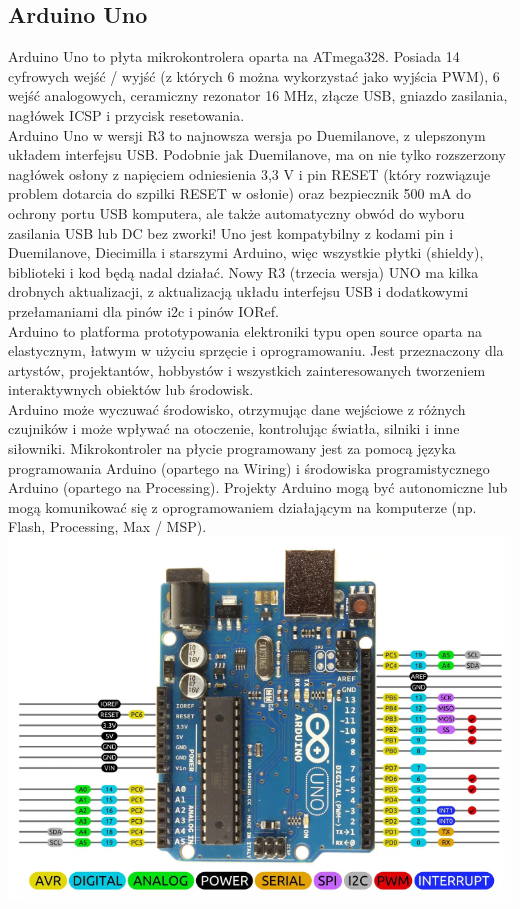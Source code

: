 \documentclass{classrep}
\begin{document}
\subsection {Arduino Uno}
Arduino Uno to płyta mikrokontrolera oparta na ATmega328. Posiada 14 cyfrowych wejść / wyjść (z których 6 można wykorzystać jako wyjścia PWM), 6 wejść analogowych, ceramiczny rezonator 16 MHz, złącze USB, gniazdo zasilania, nagłówek ICSP i przycisk resetowania.\\

Arduino Uno w wersji R3 to najnowsza wersja po Duemilanove, z ulepszonym układem interfejsu USB. Podobnie jak Duemilanove, ma on nie tylko rozszerzony nagłówek osłony z napięciem odniesienia 3,3 V i pin RESET (który rozwiązuje problem dotarcia do szpilki RESET w osłonie) oraz bezpiecznik 500 mA do ochrony portu USB komputera, ale także automatyczny obwód do wyboru zasilania USB lub DC bez zworki! Uno jest kompatybilny z kodami pin i Duemilanove, Diecimilla i starszymi Arduino, więc wszystkie płytki (shieldy), biblioteki i kod będą nadal działać. Nowy R3 (trzecia wersja) UNO ma kilka drobnych aktualizacji, z aktualizacją układu interfejsu USB i dodatkowymi przełamaniami dla pinów i2c i pinów IORef.\\

Arduino to platforma prototypowania elektroniki typu open source oparta na elastycznym, łatwym w użyciu sprzęcie i oprogramowaniu. Jest przeznaczony dla artystów, projektantów, hobbystów i wszystkich zainteresowanych tworzeniem interaktywnych obiektów lub środowisk.\\

Arduino może wyczuwać środowisko, otrzymując dane wejściowe z różnych czujników i może wpływać na otoczenie, kontrolując światła, silniki i inne siłowniki. Mikrokontroler na płycie programowany jest za pomocą języka programowania Arduino (opartego na Wiring) i środowiska programistycznego Arduino (opartego na Processing). Projekty Arduino mogą być autonomiczne lub mogą komunikować się z oprogramowaniem działającym na komputerze (np. Flash, Processing, Max / MSP).\\

\includegraphics[scale=0.5]{Arduino-Uno}
\end{document}
